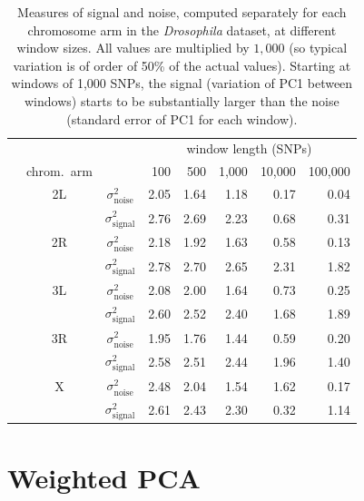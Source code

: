 \documentclass[11pt, oneside]{article}   	%
\begin{document}
\begin{table}[ht]
\centering
    \begin{tabular}{cccrrrrr}
  \hline
        & & & \multicolumn{5}{c}{window length (SNPs)} \\
 & chrom.\ arm  & & 100 & 500 & 1,000 & 10,000 & 100,000 \\ 
  \hline
    & 2L & $\sigma^2_\text{noise}$  & 2.05  &  1.64  &  1.18  &  0.17  &  0.04 \\
    & 	 & $\sigma^2_\text{signal}$ & 2.76  &  2.69  &  2.23  &  0.68  &  0.31 \\
    & 2R & $\sigma^2_\text{noise}$  & 2.18  &  1.92  &  1.63  &  0.58  &  0.13 \\
    & 	 & $\sigma^2_\text{signal}$ & 2.78  &  2.70  &  2.65  &  2.31  &  1.82 \\
    & 3L & $\sigma^2_\text{noise}$  & 2.08  &  2.00  &  1.64  &  0.73  &  0.25 \\
    & 	 & $\sigma^2_\text{signal}$ & 2.60  &  2.52  &  2.40  &  1.68  &  1.89 \\
    & 3R & $\sigma^2_\text{noise}$  & 1.95  &  1.76  &  1.44  &  0.59  &  0.20 \\
    & 	 & $\sigma^2_\text{signal}$ & 2.58  &  2.51  &  2.44  &  1.96  &  1.40 \\
    & X  & $\sigma^2_\text{noise}$  & 2.48  &  2.04  &  1.54  &  1.62  &  0.17 \\
    & 	 & $\sigma^2_\text{signal}$ & 2.61  &  2.43  &  2.30  &  0.32  &  1.14 \\
   \hline
\end{tabular}
\caption{
    Measures of signal and noise,
    computed separately for each chromosome arm in the \textit{Drosophila} dataset,
    at different window sizes.
    All values are multiplied by $1,000$
    (so typical variation is of order of 50\% of the actual values).
    Starting at windows of 1,000 SNPs, the signal (variation of PC1 between windows)
    starts to be substantially larger than the noise (standard error of PC1 for each window).
} \label{tab:window_sizes}
\end{table}


\section{Weighted PCA}
\label{apx:weighted_pca}
\end{document}
